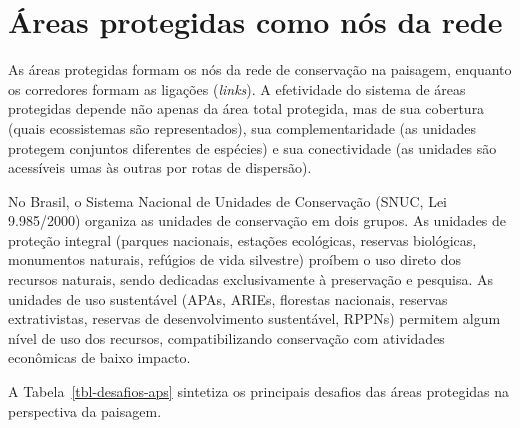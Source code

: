 \documentclass[
  portuguese,
  11pt,
  a4paper,
  open=any]{scrbook}
\begin{document}
\section{Áreas protegidas como nós da
rede}\label{uxe1reas-protegidas-como-nuxf3s-da-rede}

As áreas protegidas formam os nós da rede de conservação na paisagem,
enquanto os corredores formam as ligações (\emph{links}). A efetividade
do sistema de áreas protegidas depende não apenas da área total
protegida, mas de sua cobertura (quais ecossistemas são representados),
sua complementaridade (as unidades protegem conjuntos diferentes de
espécies) e sua conectividade (as unidades são acessíveis umas às outras
por rotas de dispersão).

No Brasil, o Sistema Nacional de Unidades de Conservação (SNUC, Lei
9.985/2000) organiza as unidades de conservação em dois grupos. As
unidades de proteção integral (parques nacionais, estações ecológicas,
reservas biológicas, monumentos naturais, refúgios de vida silvestre)
proíbem o uso direto dos recursos naturais, sendo dedicadas
exclusivamente à preservação e pesquisa. As unidades de uso sustentável
(APAs, ARIEs, florestas nacionais, reservas extrativistas, reservas de
desenvolvimento sustentável, RPPNs) permitem algum nível de uso dos
recursos, compatibilizando conservação com atividades econômicas de
baixo impacto.

A Tabela~\ref{tbl-desafios-aps} sintetiza os principais desafios das
áreas protegidas na perspectiva da paisagem.
\end{document}
